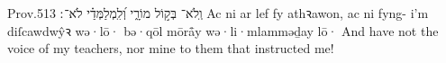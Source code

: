 \begin{example}{Prov.}{5}{13}{}{}
	\quoling
	{וְֽלֹא־ בְּק֣וֹל מוֹרָ֑י וְ֝לִֽמְלַמְּדַ֗י לֹא־ ׃}
	{Ac ni  ar lef fy athꝛawon, ac ni  fyng- i’m diſcawdwŷꝛ}
	{wə·lō· bə·qōl mōrå̄y wə·li·mlamməḏay lō· }
	{And have not  the voice of my teachers, nor  mine  to them that instructed me!}
\end{example}



